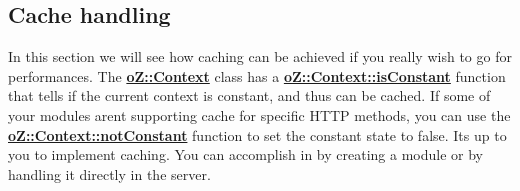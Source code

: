 \begin{DoxyCode}{0}
\DoxyCodeLine{\{}
\DoxyCodeLine{}
\DoxyCodeLine{\}}
\end{DoxyCode}


\subsection*{Cache handling}

In this section we will see how caching can be achieved if you really wish to go for performances. The {\bfseries{\mbox{\hyperlink{classo_z_1_1_context}{o\+Z\+::\+Context}}}} class has a {\bfseries{\mbox{\hyperlink{classo_z_1_1_context_a748147258019436983fdbbf6ed51c0b6}{o\+Z\+::\+Context\+::is\+Constant}}}} function that tells if the current context is constant, and thus can be cached. If some of your modules aren\textquotesingle{}t supporting cache for specific H\+T\+TP methods, you can use the {\bfseries{\mbox{\hyperlink{classo_z_1_1_context_ada521ec57fbc2febfd61177e8bbc0128}{o\+Z\+::\+Context\+::not\+Constant}}}} function to set the constant state to false. It\textquotesingle{}s up to you to implement caching. You can accomplish in by creating a module or by handling it directly in the server. 